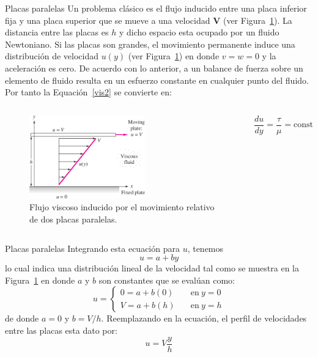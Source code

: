 \documentclass [xcolor=svgnames, t] {beamer}
\begin{document}
\begin{frame}{Placas paralelas}
\vspace{-0.4cm}
Un problema  cl\'asico es el flujo inducido entre una placa inferior fija y una placa superior que se mueve a una velocidad $\mathbf{V}$ (ver Figura~\ref{pla}). La distancia entre las placas es $h$ y dicho espacio esta ocupado por un fluido Newtoniano. Si las placas son grandes, el movimiento permanente induce una distribuci\'on de velocidad $u(y)$  (ver Figura~\ref{pla}) en donde $v=w=0$ y la aceleraci\'on es cero. De acuerdo con lo anterior, a un balance de fuerza sobre un elemento de fluido resulta en un esfuerzo constante en cualquier punto del fluido. Por tanto la Equaci\'on~\ref{vis2} se convierte en:

\begin{columns}
\begin{figure}[h]
\centering
\includegraphics[width=5cm]{plate}
\caption{Flujo viscoso inducido por el movimiento relativo de dos placas paralelas.}
\label{pla}
\end{figure}

$$
\frac{du}{dy}=\frac{\tau}{\mu}=\text{const}
$$
\end{columns}
\end{frame}

\begin{frame}{Placas paralelas}
Integrando esta ecuaci\'on para $u$, tenemos
$$
u=a+by
$$
lo cual indica una distribuci\'on lineal de la velocidad tal como se muestra en la Figura~\ref{pla} en donde $a$ y $b$ son constantes que se eval\'uan como:
$$
u= 
\begin{cases}
0 = a+b(0) & \quad \text{en}\ y=0 \\
V = a+b(h) & \quad \text{en}\ y=h 
\end{cases}
$$
de donde $a=0$ y $b=V/h$. Reemplazando en la ecuaci\'on, el perfil de velocidades entre las placas esta dato por:
\begin{equation}
u=V\frac{y}{h}
\label{upl}
\end{equation}
\end{frame}
\end{document}
